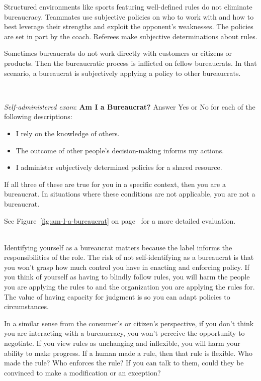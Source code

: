 Structured environments like sports featuring well-defined rules do not eliminate bureaucracy. Teammates use subjective policies on who to work with and how to best leverage their strengths and exploit the opponent's weaknesses. The policies are set in part by the coach. Referees make subjective determinations about rules.

Sometimes bureaucrats do not work directly with customers or citizens or products. Then the bureaucratic process is inflicted on fellow bureaucrats. In that scenario, a bureaucrat is subjectively applying a policy to other bureaucrats. 

\ \\


\begin{quizbox}{
      \textit{Self-administered exam}: 
      \textbf{Am I a Bureaucrat?}
}
Answer Yes or No for each of the following descriptions:
\begin{itemize}
    \item I rely on the knowledge of others. 
    \item The outcome of other people's decision-making informs my actions. 
    \item I administer subjectively determined policies for a shared resource. 
\end{itemize}
If all three of these are true for you in a specific context, then you are a bureaucrat. In situations where these conditions are not applicable, you are not a bureaucrat.
\label{box:self-administered-exam}
\end{quizbox} 
See Figure~\ref{fig:am-I-a-bureaucrat} 
\ifhaspagenumbers
on page~\pageref{fig:am-I-a-bureaucrat} 
\fi
for a more detailed evaluation.

\ \\

Identifying yourself as a bureaucrat matters because the label informs the responsibilities of the role. The risk of not self-identifying as a bureaucrat is that you won't grasp how much control you have in enacting and enforcing policy. If you think of yourself as having to blindly follow rules, you will harm the people you are applying the rules to and the organization you are applying the rules for. The value of having capacity for judgment is so you can adapt policies to circumstances. 

In a similar sense from the consumer's or citizen's perspective, if you don't think you are interacting with a bureaucracy, you won't perceive the opportunity to negotiate.  If you view rules as unchanging and inflexible, you will harm your ability to make progress. If a human made a rule, then that rule is flexible. Who made the rule? Who enforces the rule? If you can talk to them, could they be convinced to make a modification or an exception?

